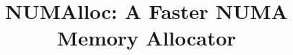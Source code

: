 \documentclass[conference]{IEEEtran}
\newcommand{\todo}[1]{{\color{red}\bfseries [[#1]]}}
\begin{document}
\title{NUMAlloc: A Faster NUMA Memory Allocator} 

\date{}
\maketitle

\thispagestyle{empty}

\begin{abstract}

\end{abstract}


\thispagestyle{plain}
\pagestyle{plain}












\end{document}
